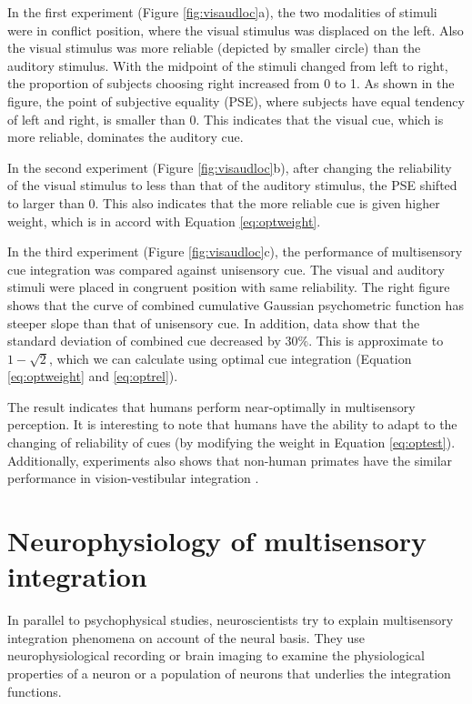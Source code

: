 \documentclass{article}[11pt]
\begin{document}
In the first experiment (Figure \ref{fig:visaudloc}a), the two modalities of stimuli were in conflict position, where the visual stimulus was displaced on the left. Also the visual stimulus was more reliable (depicted by smaller circle) than the auditory stimulus. With the midpoint of the stimuli changed from left to right, the proportion of subjects choosing right increased from 0 to 1. As shown in the figure, the point of subjective equality (PSE), where subjects have equal tendency of left and right, is smaller than 0. This indicates that the visual cue, which is more reliable, dominates the auditory cue.

In the second experiment (Figure \ref{fig:visaudloc}b), after changing the reliability of the visual stimulus to less than that of the auditory stimulus, the PSE shifted to larger than 0. This also indicates that the more reliable cue is given higher weight, which is in accord with Equation \ref{eq:optweight}.

In the third experiment (Figure \ref{fig:visaudloc}c), the performance of multisensory cue integration was compared against unisensory cue. The visual and auditory stimuli were placed in congruent position with same reliability. The right figure shows that the curve of combined cumulative Gaussian psychometric function has steeper slope than that of unisensory cue. In addition, data show that the standard deviation of combined cue decreased by $30\%$. This is approximate to $1-\sqrt{2}$, which we can calculate using optimal cue integration (Equation \ref{eq:optweight} and \ref{eq:optrel}).

The result indicates that humans perform near-optimally in multisensory perception. It is interesting to note that humans have the ability to adapt to the changing of reliability of cues (by modifying the weight in Equation \ref{eq:optest}). Additionally, experiments also shows that non-human primates have the similar performance in vision-vestibular integration \cite{gu_neural_2008}.

\section{Neurophysiology of multisensory integration}
In parallel to psychophysical studies, neuroscientists try to explain multisensory integration phenomena on account of the neural basis.
They use neurophysiological recording or brain imaging to examine the physiological properties of a neuron or a population of neurons that underlies the integration functions.
\end{document}
